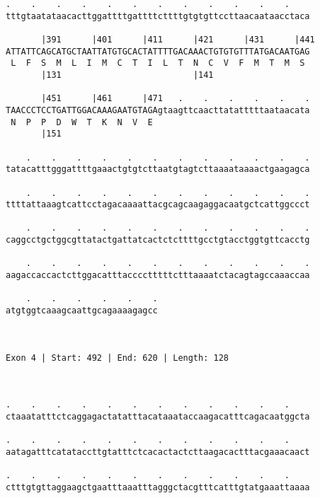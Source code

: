\documentclass{article}
\begin{document}
\begin{Verbatim}
.    .    .    .    .    .    .    .    .    .    .    .    
tttgtaatataacacttggattttgattttcttttgtgtgttccttaacaataacctaca
                                                            
       |391      |401      |411      |421      |431      |441
ATTATTCAGCATGCTAATTATGTGCACTATTTTGACAAACTGTGTGTTTATGACAATGAG
 L  F  S  M  L  I  M  C  T  I  L  T  N  C  V  F  M  T  M  S 
       |131                          |141                   
  
       |451      |461      |471   .    .    .    .    .    .
TAACCCTCCTGATTGGACAAAGAATGTAGAgtaagttcaacttatatttttaataacata
 N  P  P  D  W  T  K  N  V  E                               
       |151                                                 
  
    .    .    .    .    .    .    .    .    .    .    .    .
tatacatttgggattttgaaactgtgtcttaatgtagtcttaaaataaaactgaagagca
                                                            
    .    .    .    .    .    .    .    .    .    .    .    .
ttttattaaagtcattcctagacaaaattacgcagcaagaggacaatgctcattggccct
                                                            
    .    .    .    .    .    .    .    .    .    .    .    .
caggcctgctggcgttatactgattatcactctcttttgcctgtacctggtgttcacctg
                                                            
    .    .    .    .    .    .    .    .    .    .    .    .
aagaccaccactcttggacatttacccctttttctttaaaatctacagtagccaaaccaa
                                                            
    .    .    .    .    .    .
atgtggtcaaagcaattgcagaaaagagcc
                              
                              
 
Exon 4 | Start: 492 | End: 620 | Length: 128



.    .    .    .    .    .    .    .    .    .    .    .    
ctaaatatttctcaggagactatatttacataaataccaagacatttcagacaatggcta
                                                            
.    .    .    .    .    .    .    .    .    .    .    .    
aatagatttcatataccttgtatttctcacactactcttaagacactttacgaaacaact
                                                            
.    .    .    .    .    .    .    .    .    .    .    .    
ctttgtgttaggaagctgaatttaaatttagggctacgtttcatttgtatgaaattaaaa
                                                            

\end{Verbatim}
\end{document}

